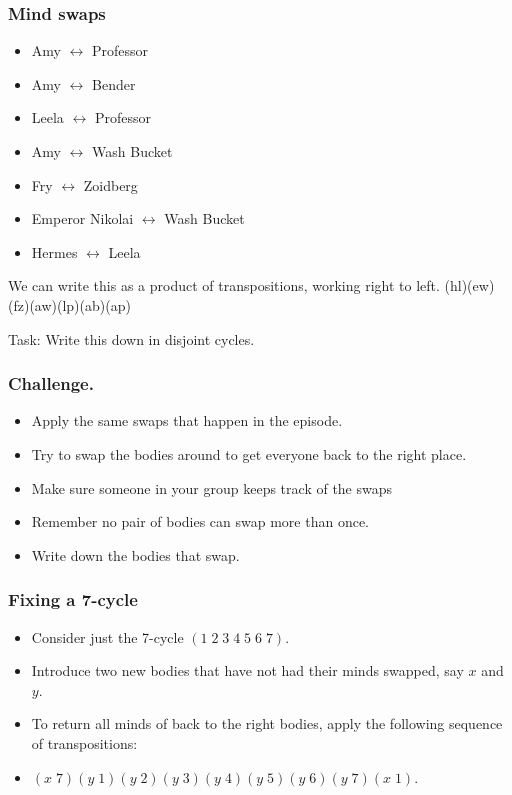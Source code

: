 \documentclass{beamer}
\begin{document}
\begin{frame}
  \frametitle{Mind swaps}
  \begin{itemize}
  \item Amy $\leftrightarrow$ Professor 
    \item Amy $\leftrightarrow$ Bender
      \item Leela $\leftrightarrow$ Professor
        \item Amy $\leftrightarrow$ Wash Bucket
          \item Fry $\leftrightarrow$ Zoidberg
            \item Emperor Nikolai $\leftrightarrow$ Wash Bucket
              \item Hermes $\leftrightarrow$ Leela
  \end{itemize}

We can write this as a product of transpositions, working right to left.  
(h\;l)(e\;w)(f\;z)(a\;w)(l\;p)(a\;b)(a\;p) 

Task: Write this down in disjoint cycles.
\end{frame}

\begin{frame}
  \frametitle{Challenge.}
  
  \begin{itemize}
  \item Apply the same swaps that happen in the episode.
    \item Try to swap the bodies around to get everyone back to the right place. 
      \item Make sure someone in your group keeps track of the swaps
        \item Remember no pair of bodies can swap more than once. 
          \item Write down the bodies that swap. 
  \end{itemize}
\end{frame}

\begin{frame}
  \frametitle{Fixing a 7-cycle}
  \begin{itemize}
  \item   Consider just the 7-cycle $(1\;2\;3\;4\;5\;6\;7)$.
\item  Introduce two new bodies that have not had their minds swapped, say $x$ and $y$.
\item  To return all minds of back to the right bodies, apply the following sequence of transpositions:
\item $(x\;7)(y\;1)(y\;2)(y\;3)(y\;4)(y\;5)(y\;6)(y\;7)(x\;1)$.
  \end{itemize}
\end{frame}
\end{document}
